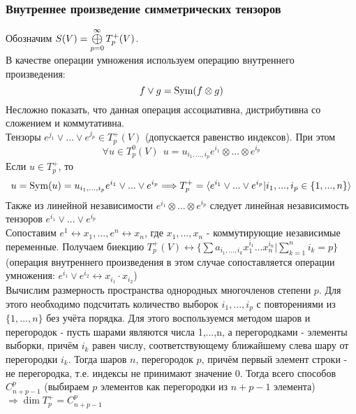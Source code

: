 \subsubsection*{Внутреннее произведение симметрических тензоров}
Обозначим $S(V) = \circledplus \limits_{p = 0}^\infty T_p^+(V)$.\\
В качестве операции умножения используем операцию внутреннего произведения:
\[f \vee g = \textup{Sym}(f \otimes g)\]
Несложно показать, что данная операция ассоциативна, дистрибутивна со сложением и коммутативна.\\
Тензоры $e^{j_1}\vee...\vee e^{j_p} \in T_p^+(V)$ (допускается равенство индексов). При этом
\[\forall u \in T_p^0(V) \ \ u = u_{i_1,...,i_p}e^{i_1}\otimes...\otimes e^{i_p}\]
Если $u \in T_p^+$, то
\[u = \textup{Sym}(u) = u_{i_1,...,i_p}e^{i_1}\vee...\vee e^{i_p} \Longrightarrow T_p^+ = \langle e^{i_1}\vee...\vee e^{i_p} | i_1,...,i_p \in \{1,...,n\}\rangle\]
Также из линейной независимости $e^{i_1}\otimes...\otimes e^{i_p}$ следует линейная независимость тензоров $e^{i_1}\vee...\vee e^{i_p}$\\
Сопоставим $e^1 \leftrightarrow x_1,..., e^n \leftrightarrow x_n$, где $x_1,...,x_n$ - коммутирующие независимые переменные. Получаем биекцию $T_p^+(V) \leftrightarrow \{\sum a_{i_1,...,i_k}x_1^{i_1}...x_n^{i_n} | \sum \limits_{k=1}^n i_k = p\}$ (операция внутреннего произведения в этом случае сопоставляется операции умножения: $e^{i_1} \vee e^{i_2} \leftrightarrow x_{i_1}\cdot x_{i_2}$)\\
Вычислим размерность пространства однородных многочленов степени $p$. Для этого необходимо подсчитать количество выборок $i_1,...,i_p$ с повторениями из $\{1,...,n\}$ без учёта порядка. Для этого воспользуемся методом шаров и перегородок - пусть шарами являются числа 1,...,n, а перегородками - элементы выборки, причём $i_k$ равен числу, соответствующему ближайшему слева шару от перегородки $i_k$. Тогда шаров $n$, перегородок $p$, причём первый элемент строки - не перегородка, т.е. индексы не принимают значение 0. Тогда всего способов $C_{n+p-1}^p$ (выбираем $p$ элементов как перегородки из $n+p-1$ элемента) $\Longrightarrow \dim T_p^+ = C_{n+p-1}^p$  
